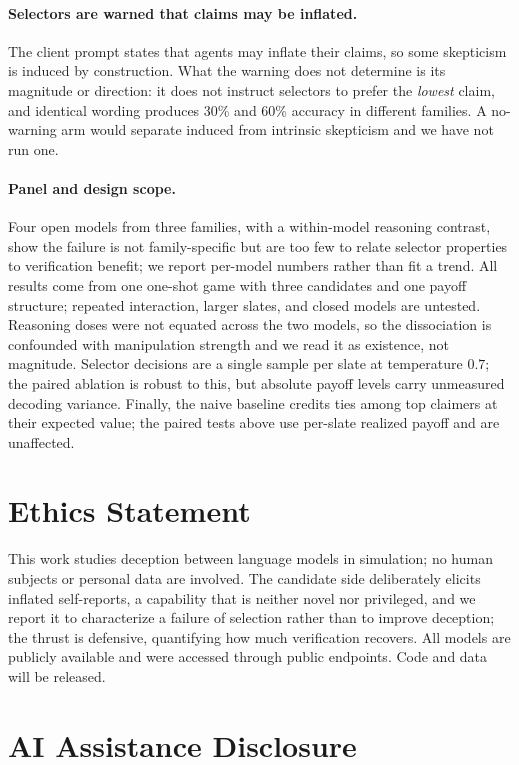 \documentclass[11pt]{article}
\begin{document}
\paragraph{Selectors are warned that claims may be inflated.} The client prompt states that
agents may inflate their claims, so some skepticism is induced by construction. What the
warning does not determine is its magnitude or direction: it does not instruct selectors to
prefer the \emph{lowest} claim, and identical wording produces 30\% and 60\% accuracy in
different families. A no-warning arm would separate induced from intrinsic skepticism and we
have not run one.

\paragraph{Panel and design scope.} Four open models from three families, with a
within-model reasoning contrast, show the failure is not family-specific but are too few
to relate selector properties to verification benefit; we report per-model numbers rather
than fit a trend. All results come from one one-shot game with three candidates and one
payoff structure; repeated interaction, larger slates, and closed models are untested.
Reasoning doses were not equated across the two models, so the dissociation is confounded
with manipulation strength and we read it as existence, not magnitude. Selector decisions
are a single sample per slate at temperature $0.7$; the paired ablation is robust to this,
but absolute payoff levels carry unmeasured decoding variance. Finally, the naive baseline
credits ties among top claimers at their expected value; the paired tests above use
per-slate realized payoff and are unaffected.

\section*{Ethics Statement}

This work studies deception between language models in simulation; no human subjects or
personal data are involved. The candidate side deliberately elicits inflated self-reports,
a capability that is neither novel nor privileged, and we report it to characterize a
failure of selection rather than to improve deception; the thrust is defensive, quantifying
how much verification recovers. All models are publicly available and were accessed through
public endpoints. Code and data will be released.

\section*{AI Assistance Disclosure}
\end{document}
